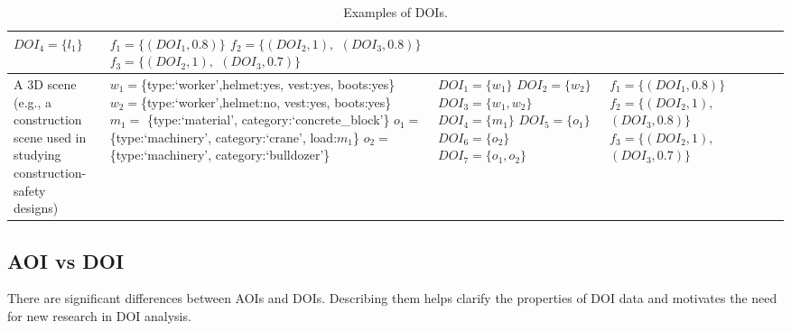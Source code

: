 \begin{table}[htbp]
\begin{tabular}{|l|l|l|l|}
{							$DOI_4 = \{l_1\}$
		}									
		&\shortstack[l]{
							$f_1 = \{(DOI_1,0.8)\}$\\
							$f_2=\{(DOI_2, 1),$\\ $(DOI_3, 0.8)\}$\\
							$f_3=\{(DOI_2, 1), $\\$(DOI_3, 0.7)\}$
							}
		\\\hline
		\shortstack[l]{
							A 3D scene (e.g., a\\construction scene used in\\studying construction-safety\\designs)}
		& \shortstack[l]{
							$w_1=$\{type:`worker',helmet:yes,\\vest:yes, boots:yes\}\\
							$w_2=$\{type:`worker',helmet:no,\\vest:yes, boots:yes\}\\
							$m_1 =$ \{type:`material',\\ category:`concrete\_block'\}\\						
							$o_1 =$ \{type:`machinery', \\category:`crane', load:$m_1$\}\\
							$o_2 =$ \{type:`machinery', \\category:`bulldozer'\}
							}
		& \shortstack[l]{
							$DOI_1 = \{w_1\}$\\
							$DOI_2 = \{w_2\}$\\
							$DOI_3 = \{w_1, w_2\}$\\
							$DOI_4 = \{m_1\}$\\
							$DOI_5 = \{o_1\}$\\
							$DOI_6 = \{o_2\}$\\
							$DOI_7 = \{o_1,o_2\}$
		}									
		&\shortstack[l]{
							$f_1 = \{(DOI_1,0.8)\}$\\
							$f_2=\{(DOI_2, 1), $\\$(DOI_3, 0.8)\}$\\
							$f_3=\{(DOI_2, 1), $\\$(DOI_3, 0.7)\}$
							}
		\\\hline
		\end{tabular}
		\caption{Examples of DOIs.}
		\label{tab:ExampleDOI}
\end{table} 

\subsection{AOI vs DOI}
\label{sec:AOIvDOI}
There are significant differences between AOIs and DOIs. Describing them helps clarify the properties of DOI data and motivates the need for new research in DOI analysis.

